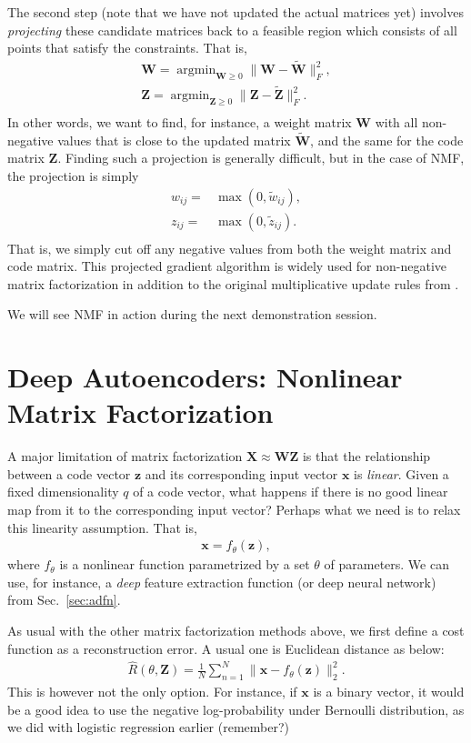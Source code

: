 \documentclass{report}
\newcommand{\vect}[1]{\mathbf{#1}}
\newcommand{\matr}[1]{\mathbf{#1}}
\newcommand{\vx}[0]{\vect{x}}
\newcommand{\vz}[0]{\vect{z}}
\newcommand{\mW}[0]{\matr{W}}
\newcommand{\mZ}[0]{\matr{Z}}
\newcommand{\mX}[0]{\matr{X}}
\DeclareMathOperator*{\argmin}{\arg \min}
\begin{document}
The second step (note that we have not updated the actual matrices yet) involves
{\it projecting} these candidate matrices back to a feasible region which
consists of all points that satisfy the constraints. That is, 
\begin{align*}
    \mW = \argmin_{\mW \geq 0} \|\mW - \tilde{\mW}\|^2_F, \\
    \mZ = \argmin_{\mZ \geq 0} \|\mZ - \tilde{\mZ}\|^2_F. \\
\end{align*}
In other words, we want to find, for instance, a weight matrix $\mW$ with all
non-negative values that is close to the updated matrix $\tilde{\mW}$, and the
same for the code matrix $\mZ$. Finding such a projection is generally
difficult, but in the case of NMF, the projection is simply
\begin{align*}
    w_{ij} =& \max(0, \tilde{w}_{ij}), \\
    z_{ij} =& \max(0, \tilde{z}_{ij}). \\
\end{align*}
That is, we simply cut off any negative values from both the weight matrix and
code matrix.  This projected gradient algorithm is widely used for non-negative
matrix factorization in addition to the original multiplicative update rules
from \cite{lee2001algorithms}.

We will see NMF in action during the next demonstration session.




\section{Deep Autoencoders: Nonlinear Matrix Factorization}

A major limitation of matrix factorization $\mX \approx \mW\mZ$ is that the
relationship between a code vector $\vz$ and its corresponding input vector
$\vx$ is {\it linear}. Given a fixed dimensionality $q$ of a code vector, what
happens if there is no good linear map from it to the corresponding input
vector? Perhaps what we need is to relax this linearity assumption. That is,
\begin{align*}
    \vx = f_{\theta}(\vz),
\end{align*}
where $f_{\theta}$ is a nonlinear function parametrized by a set $\theta$ of
parameters. We can use, for instance, a {\it deep} feature extraction function
(or deep neural network) from Sec.~\ref{sec:adfn}.

As usual with the other matrix factorization methods above, we first define a
cost function as a reconstruction error. A usual one is Euclidean distance as
below:
\begin{align*}
    \hat{R}(\theta, \mZ) = \frac{1}{N} \sum_{n=1}^N \| \vx - f_{\theta}(\vz) \|^2_2.
\end{align*}
This is however not the only option. For instance, if $\vx$ is a binary vector,
it would be a good idea to use the negative log-probability under Bernoulli
distribution, as we did with logistic regression earlier (remember?)  
\end{document}

